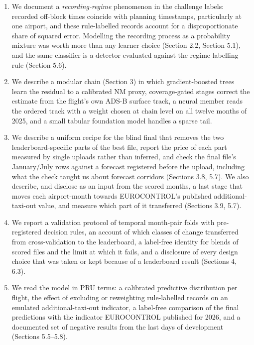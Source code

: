 \documentclass[11pt,a4paper]{article}
\providecommand{\tightlist}{\setlength{\itemsep}{0pt}\setlength{\parskip}{0pt}}
\begin{document}
\begin{enumerate}
\def\labelenumi{\arabic{enumi}.}
\tightlist
\item
  We document a \emph{recording-regime} phenomenon in the challenge labels: recorded off-block times coincide with planning timestamps, particularly at one airport, and these rule-labelled records account for a disproportionate share of squared error. Modelling the recording process as a probability mixture was worth more than any learner choice (Section 2.2, Section 5.1), and the same classifier is a detector evaluated against the regime-labelling rule (Section 5.6).
\item
  We describe a modular chain (Section 3) in which gradient-boosted trees learn the residual to a calibrated NM proxy, coverage-gated stages correct the estimate from the flight's own ADS-B surface track, a neural member reads the ordered track with a weight chosen at chain level on all twelve months of 2025, and a small tabular foundation model handles a sparse tail.
\item
  We describe a uniform recipe for the blind final that removes the two leaderboard-specific parts of the best file, report the price of each part measured by single uploads rather than inferred, and check the final file's January/July rows against a forecast registered before the upload, including what the check taught us about forecast corridors (Sections 3.8, 5.7). We also describe, and disclose as an input from the scored months, a last stage that moves each airport-month towards EUROCONTROL's published additional-taxi-out value, and measure which part of it transferred (Sections 3.9, 5.7).
\item
  We report a validation protocol of temporal month-pair folds with pre-registered decision rules, an account of which classes of change transferred from cross-validation to the leaderboard, a label-free identity for blends of scored files and the limit at which it fails, and a disclosure of every design choice that was taken or kept because of a leaderboard result (Sections 4, 6.3).
\item
  We read the model in PRU terms: a calibrated predictive distribution per flight, the effect of excluding or reweighting rule-labelled records on an emulated additional-taxi-out indicator, a label-free comparison of the final predictions with the indicator EUROCONTROL published for 2026, and a documented set of negative results from the last days of development (Sections 5.5--5.8).
\end{enumerate}
\end{document}
